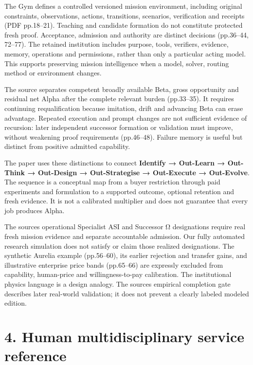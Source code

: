 \documentclass[
  10pt,
]{article}
\let\studysection\section
\renewcommand{\section}{\Needspace{7\baselineskip}\studysection}
\begin{document}
The Gym defines a controlled versioned mission environment, including
original constraints, observations, actions, transitions, scenarios,
verification and receipts (PDF pp.18--21). Teaching and candidate
formation do not constitute protected fresh proof. Acceptance, admission
and authority are distinct decisions (pp.36--44, 72--77). The retained
institution includes purpose, tools, verifiers, evidence, memory,
operations and permissions, rather than only a particular acting model.
This supports preserving mission intelligence when a model, solver,
routing method or environment changes.

The source separates competent broadly available Beta, gross opportunity
and residual net Alpha after the complete relevant burden (pp.33--35).
It requires continuing requalification because imitation, drift and
advancing Beta can erase advantage. Repeated execution and prompt
changes are not sufficient evidence of recursion: later independent
successor formation or validation must improve, without weakening proof
requirements (pp.46--48). Failure memory is useful but distinct from
positive admitted capability.

The paper uses these distinctions to connect \textbf{Identify →
Out-Learn → Out-Think → Out-Design → Out-Strategise → Out-Execute →
Out-Evolve}. The sequence is a conceptual map from a buyer restriction
through paid experiments and formulation to a supported outcome,
optional retention and fresh evidence. It is not a calibrated multiplier
and does not guarantee that every job produces Alpha.

The source\textquotesingle s operational Specialist ASI and Successor Ω
designations require real fresh mission evidence and separate
accountable admission. Our fully automated research simulation does not
satisfy or claim those realized designations. The synthetic Aurelia
example (pp.56--60), its earlier rejection and transfer gains, and
illustrative enterprise price bands (pp.65--66) are expressly excluded
from capability, human-price and willingness-to-pay calibration. The
institutional physics language is a design analogy. The
source\textquotesingle s empirical completion gate describes later
real-world validation; it does not prevent a clearly labeled modeled
edition.

\hypertarget{4-human-multidisciplinary-service-reference}{%
\section{4. Human multidisciplinary service
reference}\label{4-human-multidisciplinary-service-reference}}
\end{document}
